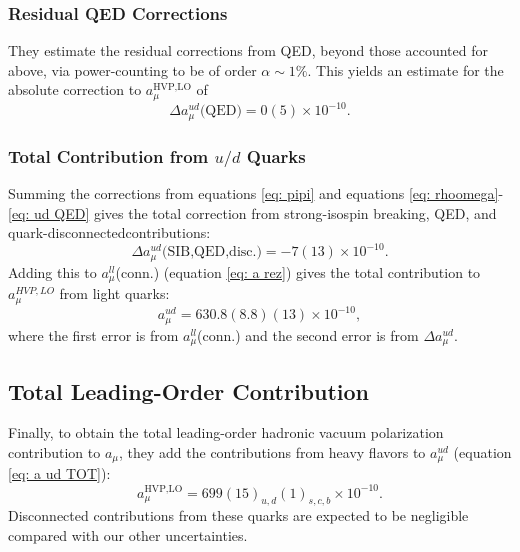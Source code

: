 \documentclass[amsfonts, amssymb, amsmath, preprint, showkeys, nofootinbib,longbibliography]{revtex4-1}
\begin{document}
\subsubsection{Residual QED Corrections}
They estimate the residual corrections from QED, beyond those accounted for above, via power-counting to be of order $α \sim 1\%$.
This yields an estimate for the absolute correction to $a_\mu^{\text{HVP,LO}}$ of
\begin{equation}
	\Delta a_\mu^{ud}\text{(QED)} = 0(5) \times 10^{-10}.
	\label{eq: ud QED}
\end{equation}

\subsubsection{Total Contribution from $u/d$ Quarks}

Summing the corrections from equations \ref{eq: pipi} and equations \ref{eq: rhoomega}-\ref{eq: ud QED} gives the total correction from strong-isospin breaking, QED, and quark-disconnectedcontributions:
\begin{equation}
	\Delta a_\mu^{ud} \text{(SIB,QED,disc.)} = -7(13)\times 10^{-10}.
\end{equation}
Adding this to $a_\mu^{ll}$(conn.) (equation \ref{eq: a rez}) gives the total contribution to $a_\mu^{HVP,LO}$ from light quarks:
\begin{equation}
	a_\mu^{ud} = 630.8(8.8)(13) \times 10^{-10},
	\label{eq: a ud TOT}
\end{equation}
where the first error is from $a_\mu^{ll}$(conn.) and the second error is from $\Delta a_\mu^{ud}$.

\subsection{Total Leading-Order Contribution}

Finally, to obtain the total leading-order hadronic vacuum polarization contribution to $a_\mu$, they add the contributions from heavy flavors to $a_\mu^{ud}$ (equation \ref{eq: a ud TOT}):
\begin{equation}
	a_\mu^{\text{HVP,LO}} = 699(15)_{u,d} (1)_{s,c,b} \times 10^{-10}.
\end{equation}
Disconnected contributions from these quarks are expected to be negligible compared with our other uncertainties.

\clearpage


\end{document}
